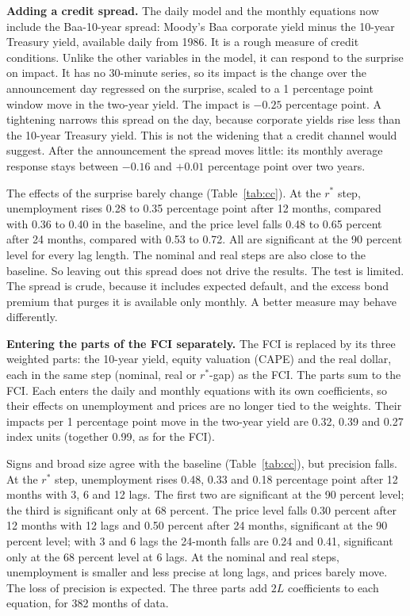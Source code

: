 \documentclass[11pt]{article}
\newcommand{\rs}{r^{*}}
\begin{document}
\textbf{Adding a credit spread.} The daily model and the monthly equations now include the Baa-10-year spread: Moody's Baa corporate yield minus the 10-year Treasury yield, available daily from 1986. It is a rough measure of credit conditions. Unlike the other variables in the model, it can respond to the surprise on impact. It has no 30-minute series, so its impact is the change over the announcement day regressed on the surprise, scaled to a 1 percentage point window move in the two-year yield. The impact is $-0.25$ percentage point. A tightening narrows this spread on the day, because corporate yields rise less than the 10-year Treasury yield. This is not the widening that a credit channel would suggest. After the announcement the spread moves little: its monthly average response stays between $-0.16$ and $+0.01$ percentage point over two years.

The effects of the surprise barely change (Table~\ref{tab:cc}). At the $\rs$ step, unemployment rises 0.28 to 0.35 percentage point after 12 months, compared with 0.36 to 0.40 in the baseline, and the price level falls 0.48 to 0.65 percent after 24 months, compared with 0.53 to 0.72. All are significant at the 90 percent level for every lag length. The nominal and real steps are also close to the baseline. So leaving out this spread does not drive the results. The test is limited. The spread is crude, because it includes expected default, and the excess bond premium that purges it is available only monthly. A better measure may behave differently.

\textbf{Entering the parts of the FCI separately.} The FCI is replaced by its three weighted parts: the 10-year yield, equity valuation (CAPE) and the real dollar, each in the same step (nominal, real or $\rs$-gap) as the FCI. The parts sum to the FCI. Each enters the daily and monthly equations with its own coefficients, so their effects on unemployment and prices are no longer tied to the weights. Their impacts per 1 percentage point move in the two-year yield are 0.32, 0.39 and 0.27 index units (together 0.99, as for the FCI).

Signs and broad size agree with the baseline (Table~\ref{tab:cc}), but precision falls. At the $\rs$ step, unemployment rises 0.48, 0.33 and 0.18 percentage point after 12 months with 3, 6 and 12 lags. The first two are significant at the 90 percent level; the third is significant only at 68 percent. The price level falls 0.30 percent after 12 months with 12 lags and 0.50 percent after 24 months, significant at the 90 percent level; with 3 and 6 lags the 24-month falls are 0.24 and 0.41, significant only at the 68 percent level at 6 lags. At the nominal and real steps, unemployment is smaller and less precise at long lags, and prices barely move. The loss of precision is expected. The three parts add $2L$ coefficients to each equation, for 382 months of data.
\end{document}
